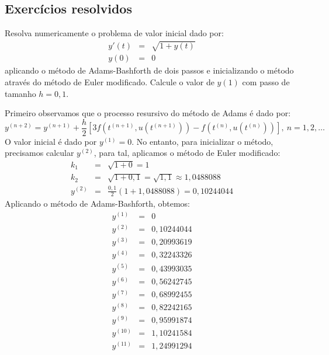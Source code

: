 
\subsection*{Exercícios resolvidos}
\begin{exeresol}\label{pvi:Adams_Bashforth:prob1} Resolva numericamente o problema de valor inicial dado por:
\begin{eqnarray*}
 y'(t)&=& \sqrt{1+y(t)}\\
 y(0)&=& 0
\end{eqnarray*}
aplicando o método de Adams-Bashforth de dois passos e inicializando o método através do método de Euler modificado. Calcule o valor de $y(1)$ com passo de tamanho $h=0,1$.
\end{exeresol}
\begin{resol} 
Primeiro observamos que o processo resursivo do método de Adams é dado por: 
\begin{equation*}
  y^{(n+2)}=y^{(n+1)}+\frac{h}{2}\left[3f\left(t^{(n+1)},u(t^{(n+1)})\right)-f\left(t^{(n)},u(t^{(n)})\right)\right],~n=1,2,\ldots
 \end{equation*}
O valor inicial é dado por $y^{(1)}=0$. No entanto, para inicializar o método, precisamos calcular $y^{(2)}$, para tal, aplicamos o método de Euler modificado:
\begin{eqnarray*}
 k_1&=&\sqrt{1+0}=1\\
 k_2&=&\sqrt{1+0,1}=\sqrt{1,1}\approx 1,0488088 \\
 y^{(2)}&=& \frac{0,1}{2}\left(1+1,0488088 \right)=0,10244044 
  \end{eqnarray*}
Aplicando o método de Adams-Bashforth, obtemos:  
  \begin{eqnarray*}
 y^{(1)}&=&0\\
 y^{(2)}&=&0,10244044\\
 y^{(3)}&=&0,20993619\\
 y^{(4)}&=&0,32243326\\
 y^{(5)}&=&0,43993035\\
 y^{(6)}&=&0,56242745\\
 y^{(7)}&=&0,68992455\\
 y^{(8)}&=&0,82242165\\
 y^{(9)}&=&0,95991874\\
 y^{(10)}&=&1,10241584\\
 y^{(11)}&=&1,24991294
  \end{eqnarray*}
\end{resol}

